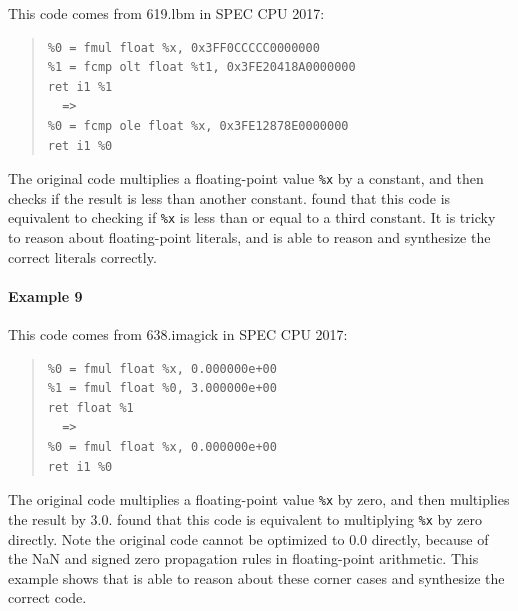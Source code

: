 This code comes from 619.lbm in SPEC CPU 2017:


{\small\begin{quote}\begin{verbatim}
%0 = fmul float %x, 0x3FF0CCCCC0000000
%1 = fcmp olt float %t1, 0x3FE20418A0000000
ret i1 %1
  =>
%0 = fcmp ole float %x, 0x3FE12878E0000000
ret i1 %0
\end{verbatim}
\end{quote}}

The original code multiplies a floating-point value \texttt{\%x} by a
constant, and then checks if the result is less than another constant.
\minotaur{} found that this code is equivalent to checking if \texttt{\%x}
is less than or equal to a third constant.
It is tricky to reason about floating-point literals, and \minotaur{} is able to
reason and synthesize the correct literals correctly.

\paragraph*{Example 9}

This code comes from 638.imagick in SPEC CPU 2017:

{\small\begin{quote}\begin{verbatim}
%0 = fmul float %x, 0.000000e+00
%1 = fmul float %0, 3.000000e+00
ret float %1
  =>
%0 = fmul float %x, 0.000000e+00
ret i1 %0
\end{verbatim}
\end{quote}}

The original code multiplies a floating-point value \texttt{\%x} by
zero, and then multiplies the result by 3.0. \minotaur{} found that this
code is equivalent to multiplying \texttt{\%x} by zero directly.
Note the original code cannot be optimized to 0.0 directly, because of
the NaN and signed zero propagation rules in floating-point arithmetic.
This example shows that \minotaur{} is able to reason about these corner
cases and synthesize the correct code.







